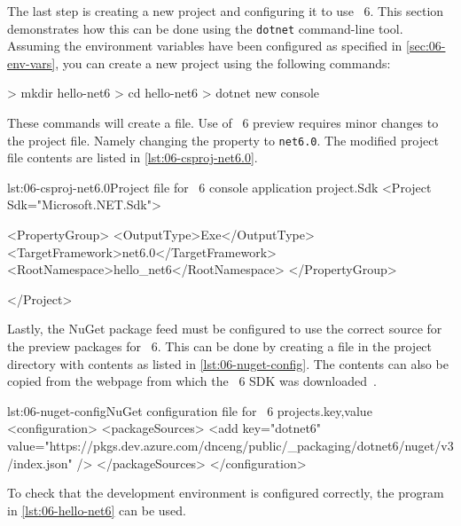The last step is creating a new project and configuring it to use \dotnet{}~6. This section
demonstrates how this can be done using the \verb|dotnet| command-line tool. Assuming the
environment variables have been configured as specified in \autoref{sec:06-env-vars}, you can create
a new project using the following commands:

\begin{myVerbatim}
> mkdir hello-net6
> cd hello-net6
> dotnet new console
\end{myVerbatim}

These commands will create a  file. Use of \dotnet{}~6
preview requires minor changes to the project file. Namely changing the 
property to \verb|net6.0|. The modified project file contents are listed in
\autoref{lst:06-csproj-net6.0}.

\begin{myListingXml}{lst:06-csproj-net6.0}{Project file for \dotnet{}~6 console application project.}{Sdk}
<Project Sdk="Microsoft.NET.Sdk">

  <PropertyGroup>
    <OutputType>Exe</OutputType>
    <TargetFramework>net6.0</TargetFramework>
    <RootNamespace>hello_net6</RootNamespace>
  </PropertyGroup>

</Project>
\end{myListingXml}

Lastly, the NuGet package feed must be configured to use the correct source for the preview packages
for \dotnet{}~6. This can be done by creating a  file in the project
directory with contents as listed in \autoref{lst:06-nuget-config}. The contents can also be copied
from the webpage from which the \dotnet{}~6 SDK was downloaded~\cite{dotnetSdkGithub}.

\begin{myListingXml}[basicstyle=\ttfamily\scriptsize]{lst:06-nuget-config}{NuGet configuration file for \dotnet{}~6 projects.}{key,value}
<configuration>
  <packageSources>
    <add key="dotnet6"
      value="https://pkgs.dev.azure.com/dnceng/public/_packaging/dotnet6/nuget/v3/index.json" />
  </packageSources>
</configuration>
\end{myListingXml}

To check that the development environment is configured correctly, the program in
\autoref{lst:06-hello-net6} can be used.

